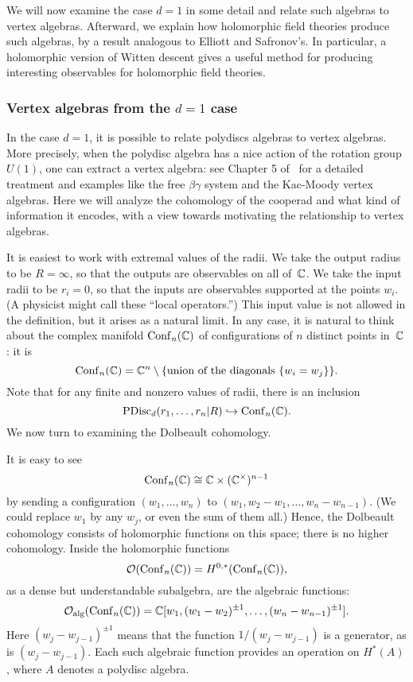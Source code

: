 \documentclass[11pt]{amsart}
\begin{document}
We will now examine the case $d=1$ in some detail and relate such algebras to vertex algebras.
Afterward, we explain how holomorphic field theories produce such algebras,
by a result analogous to Elliott and Safronov's.
In particular, a holomorphic version of Witten descent gives a useful method for producing interesting observables for holomorphic field theories.

\subsubsection{Vertex algebras from the $d=1$ case}

In the case $d=1$, it is possible to relate polydiscs algebras to vertex algebras.
More precisely, when the polydisc algebra has a nice action of the rotation group~$U(1)$,
one can extract a vertex algebra: 
see Chapter 5 of~\cite{CG1} for a detailed treatment and examples like the free $\beta\gamma$ system and the Kac-Moody vertex algebras.
Here we will analyze the cohomology of the cooperad and what kind of information it encodes, with a view towards motivating the relationship to vertex algebras.

It is easiest to work with extremal values of the radii.
We take the output radius to be $R = \infty$,
so that the outputs are observables on all of~$\mathbb C$.
We take the input radii to be $r_i = 0$,
so that the inputs are observables supported at the points $w_i$.
(A physicist might call these ``local operators.'')
This input value is not allowed in the definition, but it arises as a natural limit.
In any case, it is natural to think about the complex manifold ${\rm Conf}_n(\mathbb C)$ of configurations of $n$ distinct points in~$\mathbb C$:
it is
\[
{\rm Conf}_n(\mathbb C) = \mathbb C^n \setminus \{\text{union of the diagonals $\{ w_i = w_j\}$}\}.
\]
Note that for any finite and nonzero values of radii, there is an inclusion
\[
{\rm PDisc}_d(r_1, \ldots, r_n| R) \hookrightarrow {\rm Conf}_n(\mathbb C).
\]
We now turn to examining the Dolbeault cohomology.

It is easy to see
\[
{\rm Conf}_n(\mathbb C) \cong \mathbb C \times (\mathbb C^\times)^{n-1}
\]
by sending a configuration $(w_1,\ldots, w_n)$ to $(w_1, w_2 - w_1, \ldots, w_n-w_{n-1})$.
(We could replace $w_1$ by any $w_j$, or even the sum of them all.)
Hence, the Dolbeault cohomology consists of holomorphic functions on this space;
there is no higher cohomology.
Inside the holomorphic functions 
\[
\mathcal O({\rm Conf}_n(\mathbb C)) = H^{0,*}({\rm Conf}_n(\mathbb C)),
\] 
as a dense but understandable subalgebra, are the algebraic functions:
\[
\mathcal O_{\rm alg}({\rm Conf}_n(\mathbb C)) = \mathbb C[w_1, (w_1 - w_2)^{\pm 1}, \ldots, (w_n - w_{n-1})^{\pm 1}].
\]
Here $(w_j - w_{j-1})^{\pm 1}$ means that the function $1/(w_j - w_{j-1})$ is a generator, 
as is $(w_j - w_{j-1})$.
Each such algebraic function provides an operation on $H^*(A)$, where $A$ denotes a polydisc algebra.
\end{document}
